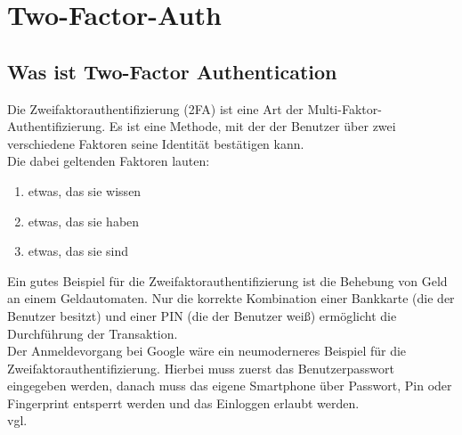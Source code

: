\section{Two-Factor-Auth}
\label{sec:2fa}
\subsection{Was ist Two-Factor Authentication}
Die Zweifaktorauthentifizierung (2FA) ist eine Art der Multi-Faktor-Authentifizierung. Es ist eine Methode, mit der der Benutzer über zwei verschiedene Faktoren seine Identität bestätigen kann.\\
Die dabei geltenden Faktoren lauten:
\begin{enumerate}
\item etwas, das sie wissen
\item etwas, das sie haben
\item etwas, das sie sind
\end{enumerate}
Ein gutes Beispiel für die Zweifaktorauthentifizierung ist die Behebung von Geld an einem Geldautomaten. Nur die korrekte Kombination einer Bankkarte (die der Benutzer besitzt) und einer PIN (die der Benutzer weiß) ermöglicht die Durchführung der Transaktion.\\Der Anmeldevorgang bei Google wäre ein neumoderneres Beispiel für die Zweifaktorauthentifizierung. Hierbei muss zuerst das Benutzerpasswort eingegeben werden, danach muss das eigene Smartphone über Passwort, Pin oder Fingerprint entsperrt werden und das Einloggen erlaubt werden. 
\\ vgl. \textcite{2FA}
